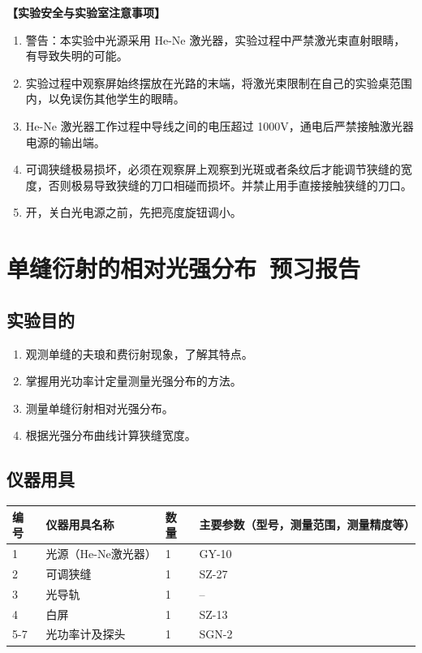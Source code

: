 \documentclass[dvipsnames, svgnames,a4paper,11pt]{article}
\begin{document}
\textbf{【实验安全与实验室注意事项】}\\
\begin{enumerate}
    \item 警告：本实验中光源采用 He-Ne 激光器，实验过程中严禁激光束直射眼睛，有导致失明的可能。
    \item 实验过程中观察屏始终摆放在光路的末端，将激光束限制在自己的实验桌范围内，以免误伤其他学生的眼睛。
    \item He-Ne 激光器工作过程中导线之间的电压超过 1000V，通电后严禁接触激光器电源的输出端。
    \item 可调狭缝极易损坏，必须在观察屏上观察到光斑或者条纹后才能调节狭缝的宽度，否则极易导致狭缝的刀口相碰而损坏。并禁止用手直接接触狭缝的刀口。
    \item 开，关白光电源之前，先把亮度旋钮调小。
\end{enumerate}

\clearpage
\tableofcontents
\clearpage

\setcounter{section}{0}
\section{单缝衍射的相对光强分布\ \textbf{预习报告}}
	
\subsection{实验目的}
\begin{enumerate}
    \item 观测单缝的夫琅和费衍射现象，了解其特点。
	\item 掌握用光功率计定量测量光强分布的方法。
	\item 测量单缝衍射相对光强分布。
	\item 根据光强分布曲线计算狭缝宽度。
\end{enumerate}
\subsection{仪器用具}
\begin{table}[htbp]
	\centering
	\renewcommand\arraystretch{1.6}
	\begin{tabular}{p{}|p{}|p{}|p{}}
	\hline
	编号& 仪器用具名称 & 数量 &  主要参数（型号，测量范围，测量精度等） \\
	\hline
	1&光源（He-Ne激光器）&1 &GY-10\\
	\hline
	2&可调狭缝 &1&SZ-27\\
	\hline
	3&光导轨&1&--\\
	\hline
	4&白屏&1&SZ-13\\
	\hline
	5-7&光功率计及探头&1&SGN-2\\
	\hline
\end{tabular}
\end{table}
\end{document}
